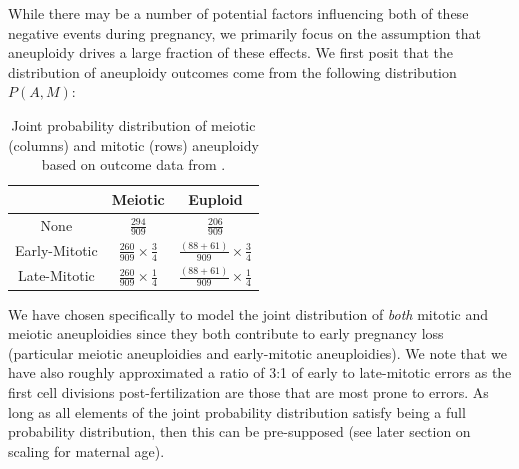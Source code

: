 \documentclass{article}
\begin{document}
While there may be a number of potential factors influencing both of these negative events during pregnancy, we primarily focus on the assumption that aneuploidy drives a large fraction of these effects. We first posit that the distribution of aneuploidy outcomes come from the following distribution $P(A,M)$: 


\begin{table}[H]
\begin{center}
	\begin{tabular}{ |c|c|c| } 
	 \hline
	  & Meiotic & Euploid  \\ 
	 \hline
	 None & $\frac{294}{909}$ & $\frac{206}{909}$ \\ 
	 \hline
	 Early-Mitotic & $\frac{260}{909}\times \frac{3}{4}$ & $\frac{(88 + 61)}{909}\times \frac{3}{4}$ \\
	 \hline
	 Late-Mitotic & $\frac{260}{909}\times \frac{1}{4}$ & $\frac{(88 + 61)}{909}\times \frac{1}{4}$\\
	 \hline
	\end{tabular}
	\caption{Joint probability distribution of meiotic (columns) and mitotic (rows) aneuploidy based on outcome data from \citep{McCoy2023-dg}.}
	\label{table:1}
	\end{center}
\end{table}

We have chosen specifically to model the joint distribution of \textit{both} mitotic and meiotic aneuploidies since they both contribute to early pregnancy loss (particular meiotic aneuploidies and early-mitotic aneuploidies). We note that we have also roughly approximated a ratio of 3:1 of early to late-mitotic errors as the first cell divisions post-fertilization are those that are most prone to errors. As long as all elements of the joint probability distribution satisfy being a full probability distribution, then this can be pre-supposed (see later section on scaling for maternal age). 
\end{document}
